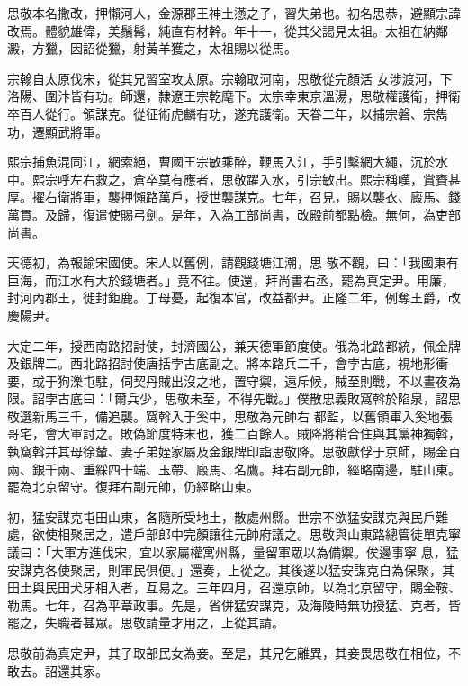 \begin{pinyinscope}
 思敬本名撒改，押懶河人，金源郡王神土懣之子，習失弟也。初名思恭，避顯宗諱改焉。體貌雄偉，美鬚髯，純直有材幹。年十一，從其父謁見太祖。太祖在納鄰澱，方獵，因詔從獵，射黃羊獲之，太祖賜以從馬。



 宗翰自太原伐宋，從其兄習室攻太原。宗翰取河南，思敬從完顏活
 女涉渡河，下洛陽、圍汴皆有功。師還，隸遼王宗乾麾下。太宗幸東京溫湯，思敬權護衛，押衛卒百人從行。領謀克。從征術虎麟有功，遂充護衛。天眷二年，以捕宗磐、宗雋功，遷顯武將軍。



 熙宗捕魚混同江，網索絕，曹國王宗敏乘醉，鞭馬入江，手引繫網大繩，沉於水中。熙宗呼左右救之，倉卒莫有應者，思敬躍入水，引宗敏出。熙宗稱嘆，賞賚甚厚。擢右衛將軍，襲押懶路萬戶，授世襲謀克。七年，召見，賜以襲衣、廄馬、錢萬貫。及歸，復遣使賜弓劍。是年，入為工部尚書，改殿前都點檢。無何，為吏部尚書。



 天德初，為報諭宋國使。宋人以舊例，請觀錢塘江潮，思
 敬不觀，曰：「我國東有巨海，而江水有大於錢塘者。」竟不往。使還，拜尚書右丞，罷為真定尹。用廉，封河內郡王，徙封鉅鹿。丁母憂，起復本官，改益都尹。正隆二年，例奪王爵，改慶陽尹。



 大定二年，授西南路招討使，封濟國公，兼天德軍節度使。俄為北路都統，佩金牌及銀牌二。西北路招討使唐括孛古底副之。將本路兵二千，會孛古底，視地形衝要，或于狗濼屯駐，伺契丹賊出沒之地，置守禦，遠斥候，賊至則戰，不以晝夜為限。詔孛古底曰：「爾兵少，思敬未至，不得先戰。」僕散忠義敗窩斡於陷泉，詔思敬選新馬三千，備追襲。窩斡入于奚中，思敬為元帥右
 都監，以舊領軍入奚地張哥宅，會大軍討之。敗偽節度特末也，獲二百餘人。賊降將稍合住與其黨神獨斡，執窩斡并其母徐輦、妻子弟姪家屬及金銀牌印詣思敬降。思敬獻俘于京師，賜金百兩、銀千兩、重綵四十端、玉帶、廄馬、名鷹。拜右副元帥，經略南邊，駐山東。罷為北京留守。復拜右副元帥，仍經略山東。



 初，猛安謀克屯田山東，各隨所受地土，散處州縣。世宗不欲猛安謀克與民戶難處，欲使相聚居之，遣戶部郎中完顏讓往元帥府議之。思敬與山東路總管徒單克寧議曰：「大軍方進伐宋，宜以家屬權寓州縣，量留軍眾以為備禦。俟邊事寧
 息，猛安謀克各使聚居，則軍民俱便。」還奏，上從之。其後遂以猛安謀克自為保聚，其田土與民田犬牙相入者，互易之。三年四月，召還京師，以為北京留守，賜金鞍、勒馬。七年，召為平章政事。先是，省併猛安謀克，及海陵時無功授猛、克者，皆罷之，失職者甚眾。思敬請量才用之，上從其請。



 思敬前為真定尹，其子取部民女為妾。至是，其兄乞離異，其妾畏思敬在相位，不敢去。詔還其家。




\end{pinyinscope}
